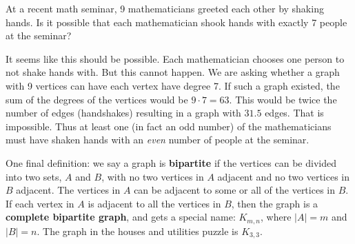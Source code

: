\documentclass[11pt,]{book}
\newcommand{\terminology}[1]{\textbf{#1}}
\theoremstyle{ptxplainnotitle}
\theoremstyle{ptxplaintitle}
\theoremstyle{ptxdefinitionnotitle}
\theoremstyle{ptxdefinitiontitle}
\theoremstyle{ptxdefinitionnotitle}
\theoremstyle{ptxdefinitiontitle}
\theoremstyle{ptxdefinitionnotitle}
\theoremstyle{ptxdefinitiontitle}
\theoremstyle{ptxdefinitiontitlenonumber}
\theoremstyle{ptxdefinitiontitlenonumber}
\numberwithin{equation}{chapter}
\begin{document}
\begin{example}\label{example-79}
\hypertarget{p-2525}{}%
At a recent math seminar, 9 mathematicians greeted each other by shaking hands. Is it possible that each mathematician shook hands with exactly 7 people at the seminar?%
\par\smallskip%
\noindent\textbf{}\hypertarget{solution-276}{}\hypertarget{p-2526}{}%
It seems like this should be possible. Each mathematician chooses one person to not shake hands with. But this cannot happen. We are asking whether a graph with 9 vertices can have each vertex have degree 7. If such a graph existed, the sum of the degrees of the vertices would be \(9\cdot 7 = 63\). This would be twice the number of edges (handshakes) resulting in a graph with \(31.5\) edges. That is impossible. Thus at least one (in fact an odd number) of the mathematicians must have shaken hands with an \emph{even} number of people at the seminar.%
\end{example}
\hypertarget{p-2527}{}%
One final definition: we say a graph is \terminology{bipartite} if the vertices can be divided into two sets, \(A\) and \(B\), with no two vertices in \(A\) adjacent and no two vertices in \(B\) adjacent. The vertices in \(A\) can be adjacent to some or all of the vertices in \(B\). If each vertex in \(A\) is adjacent to all the vertices in \(B\), then the graph is a \terminology{complete bipartite graph}, and gets a special name: \(K_{m,n}\), where \(|A| = m\) and \(|B| = n\). The graph in the houses and utilities puzzle is \(K_{3,3}\).%
\typeout{************************************************}
\typeout{************************************************}
\end{document}
